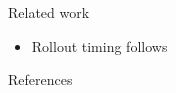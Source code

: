 \documentclass[11pt,aspectratio=169]{beamer}
\begin{document}
\begin{frame}{Related work}
  \begin{itemize}
    \item Rollout timing follows \cite{fixtureRollout2021}
  \end{itemize}
\end{frame}

\begin{frame}{References}
  
  
\end{frame}
\end{document}
